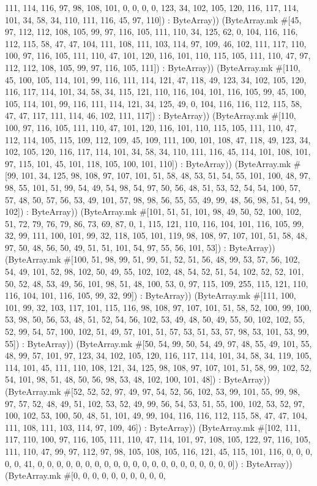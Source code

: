 \documentclass[11pt]{article}
\begin{document}
111, 114, 116, 97, 98, 108, 101, 0, 0, 0, 0, 123, 34, 102, 105, 120, 116, 117, 114, 101, 34, 58, 34, 110, 111, 116, 45, 97, 110]) : ByteArray)) (ByteArray.mk \#[45, 97, 112, 112, 108, 105, 99, 97, 116, 105, 111, 110, 34, 125, 62, 0, 104, 116, 116, 112, 115, 58, 47, 47, 104, 111, 108, 111, 103, 114, 97, 109, 46, 102, 111, 117, 110, 100, 97, 116, 105, 111, 110, 47, 101, 120, 116, 101, 110, 115, 105, 111, 110, 47, 97, 112, 112, 108, 105, 99, 97, 116, 105, 111]) : ByteArray)) (ByteArray.mk \#[110, 45, 100, 105, 114, 101, 99, 116, 111, 114, 121, 47, 118, 49, 123, 34, 102, 105, 120, 116, 117, 114, 101, 34, 58, 34, 115, 121, 110, 116, 104, 101, 116, 105, 99, 45, 100, 105, 114, 101, 99, 116, 111, 114, 121, 34, 125, 49, 0, 104, 116, 116, 112, 115, 58, 47, 47, 117, 111, 114, 46, 102, 111, 117]) : ByteArray)) (ByteArray.mk \#[110, 100, 97, 116, 105, 111, 110, 47, 101, 120, 116, 101, 110, 115, 105, 111, 110, 47, 112, 114, 105, 115, 109, 112, 109, 45, 109, 111, 100, 101, 108, 47, 118, 49, 123, 34, 102, 105, 120, 116, 117, 114, 101, 34, 58, 34, 110, 111, 116, 45, 114, 101, 108, 101, 97, 115, 101, 45, 101, 118, 105, 100, 101, 110]) : ByteArray)) (ByteArray.mk \#[99, 101, 34, 125, 98, 108, 97, 107, 101, 51, 58, 48, 53, 51, 54, 55, 101, 100, 48, 97, 98, 55, 101, 51, 99, 54, 49, 54, 98, 54, 97, 50, 56, 48, 51, 53, 52, 54, 54, 100, 57, 57, 48, 50, 57, 56, 53, 49, 101, 57, 98, 98, 56, 55, 55, 49, 99, 48, 56, 98, 51, 54, 99, 102]) : ByteArray)) (ByteArray.mk \#[101, 51, 51, 101, 98, 49, 50, 52, 100, 102, 51, 72, 79, 76, 79, 86, 73, 69, 87, 0, 1, 115, 121, 110, 116, 104, 101, 116, 105, 99, 32, 99, 111, 100, 101, 99, 32, 118, 105, 101, 119, 98, 108, 97, 107, 101, 51, 58, 48, 97, 50, 48, 56, 50, 49, 51, 51, 101, 54, 97, 55, 56, 101, 53]) : ByteArray)) (ByteArray.mk \#[100, 51, 98, 99, 51, 99, 51, 52, 51, 56, 48, 99, 53, 57, 56, 102, 54, 49, 101, 52, 98, 102, 50, 49, 55, 102, 102, 48, 54, 52, 51, 54, 102, 52, 52, 101, 50, 52, 48, 53, 49, 56, 101, 98, 51, 48, 100, 53, 0, 97, 115, 109, 255, 115, 121, 110, 116, 104, 101, 116, 105, 99, 32, 99]) : ByteArray)) (ByteArray.mk \#[111, 100, 101, 99, 32, 103, 117, 101, 115, 116, 98, 108, 97, 107, 101, 51, 58, 52, 100, 99, 100, 53, 98, 50, 56, 53, 48, 51, 52, 54, 56, 102, 53, 49, 48, 50, 49, 55, 50, 102, 102, 55, 52, 99, 54, 57, 100, 102, 51, 49, 57, 101, 51, 57, 53, 51, 53, 57, 98, 53, 101, 53, 99, 55]) : ByteArray)) (ByteArray.mk \#[50, 54, 99, 50, 54, 49, 97, 48, 55, 49, 101, 55, 48, 99, 57, 101, 97, 123, 34, 102, 105, 120, 116, 117, 114, 101, 34, 58, 34, 119, 105, 114, 101, 45, 111, 110, 108, 121, 34, 125, 98, 108, 97, 107, 101, 51, 58, 99, 102, 52, 54, 101, 98, 51, 48, 50, 56, 98, 53, 48, 102, 100, 101, 48]) : ByteArray)) (ByteArray.mk \#[52, 52, 52, 97, 49, 97, 54, 52, 56, 102, 53, 99, 101, 55, 99, 98, 97, 57, 52, 48, 49, 51, 102, 53, 52, 49, 99, 56, 54, 53, 51, 55, 100, 102, 53, 52, 97, 100, 102, 53, 100, 50, 48, 51, 101, 49, 99, 104, 116, 116, 112, 115, 58, 47, 47, 104, 111, 108, 111, 103, 114, 97, 109, 46]) : ByteArray)) (ByteArray.mk \#[102, 111, 117, 110, 100, 97, 116, 105, 111, 110, 47, 114, 101, 97, 108, 105, 122, 97, 116, 105, 111, 110, 47, 99, 97, 112, 97, 98, 105, 108, 105, 116, 121, 45, 115, 101, 116, 0, 0, 0, 0, 0, 41, 0, 0, 0, 0, 0, 0, 0, 0, 0, 0, 0, 0, 0, 0, 0, 0, 0, 0, 0, 0, 0]) : ByteArray)) (ByteArray.mk \#[0, 0, 0, 0, 0, 0, 0, 0, 0, 0, 
\end{document}
